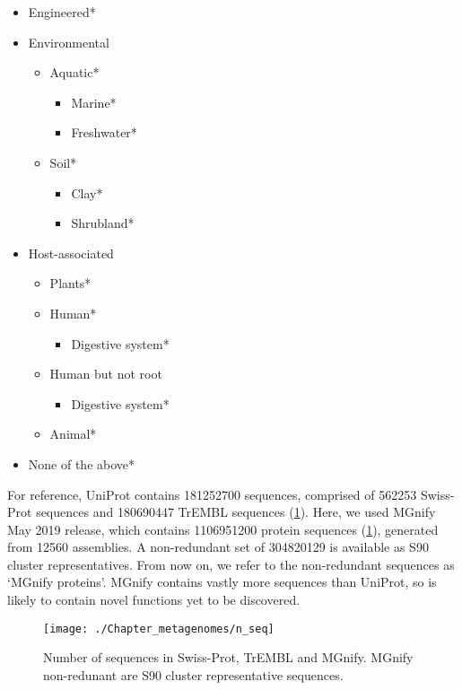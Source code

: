 \begin{itemize}
\item Engineered*
\item Environmental
  \begin{itemize}
  \item Aquatic*
    \begin{itemize}
    \item Marine*
    \item Freshwater*
    \end{itemize}
  \item Soil*
    \begin{itemize}
    \item Clay*
    \item Shrubland*
    \end{itemize}
  \end{itemize}
\item Host-associated
  \begin{itemize}
  \item Plants*
  \item Human*
    \begin{itemize}
    \item Digestive system*
    \end{itemize}
  \item Human but not root
    \begin{itemize}
    \item Digestive system*
    \end{itemize}
  \item Animal*
  \end{itemize}
\item None of the above*
\end{itemize}

For reference, UniProt contains \num{181252700} sequences, comprised of \num{562253} Swiss-Prot sequences and \num{180690447} TrEMBL sequences (\ref{fig:n_seq}). Here, we used MGnify May 2019 release, which contains \num{1106951200} protein sequences (\ref{fig:n_seq}), generated from \num{12560} assemblies. A non-redundant set of \num{304820129} is available as S90 cluster representatives. From now on, we refer to the non-redundant sequences as `MGnify proteins'. MGnify contains vastly more sequences than UniProt, so is likely to contain novel functions yet to be discovered.

\begin{figure}[!hbt]
    \centering
    \texttt{[image: ./Chapter\_metagenomes/n\_seq]}
    \caption{%
        Number of sequences in Swiss-Prot, TrEMBL and MGnify.
        MGnify non-redunant are S90 cluster representative sequences.
    }
    \label{fig:n_seq}
\end{figure}

